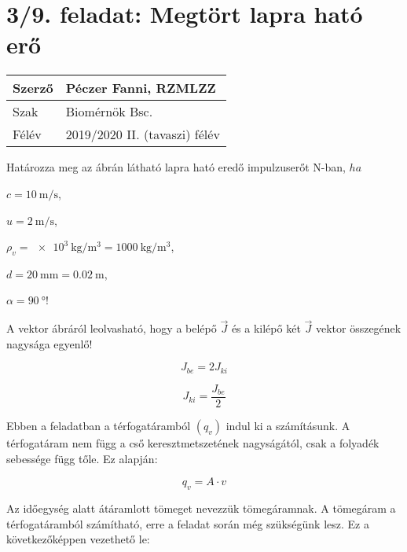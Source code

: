 \section*{3/9. feladat: Megtört lapra ható erő}
\begin{tabular}{ | p{2cm} | p{14cm} | } 
	\hline 
	Szerző & Péczer Fanni, RZMLZZ \\
	\hline
	Szak & Biomérnök Bsc. \\
	\hline	Félév & 2019/2020 II. (tavaszi) félév  \\
	\hline
\end{tabular}
\vspace{0.5cm}

\noindent Határozza meg az ábrán látható lapra ható eredő impulzuserőt N-ban, $ha$

$c=\SI{10}{\meter\per\second}$,

$u=\SI{2}{\meter\per\second}$,

$\rho_v=\SI{e3}{\kilo\gram\per\meter\cubed}=\SI{1000}{\kilo\gram\per\meter\cubed}$,

$d=\SI{20}{\milli\meter}=\SI{0,02}{\meter}$,

$\alpha=\SI{90}{\degree}$!



\noindent\hrulefill


\noindent A vektor ábráról leolvasható, hogy a belépő $\vec{J}$ és a kilépő két $\vec{J}$ vektor összegének nagysága egyenlő!

\begin{equation}
J_{be} = 2 J_{ki}
\end{equation}

\begin{equation}
J_{ki} = \frac{J_{be}}{2}
\end{equation}

\noindent Ebben a feladatban a térfogatáramból $(q_v)$ indul ki a számításunk. A térfogatáram nem függ a cső keresztmetszetének nagyságától, csak a folyadék sebessége függ tőle. Ez alapján:

\begin{equation}
q_v=A\cdot{v}
\end{equation}

\noindent Az időegység alatt átáramlott tömeget nevezzük tömegáramnak. A tömegáram a térfogatáramból számítható, erre a feladat során még szükségünk lesz. Ez a következőképpen vezethető le:

